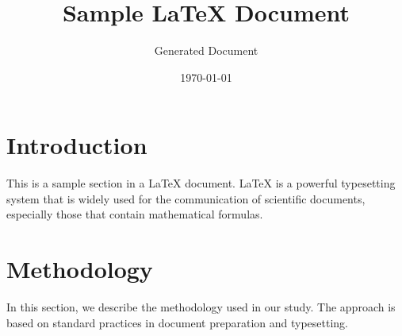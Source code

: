 \documentclass{article}
\title{Sample LaTeX Document}
\author{Generated Document}
\date{\today}
\begin{document}
\maketitle

\section{Introduction}
This is a sample section in a LaTeX document. LaTeX is a powerful typesetting system that is widely used for the communication of scientific documents, especially those that contain mathematical formulas.

\section{Methodology}
In this section, we describe the methodology used in our study. The approach is based on standard practices in document preparation and typesetting.
\end{document}
